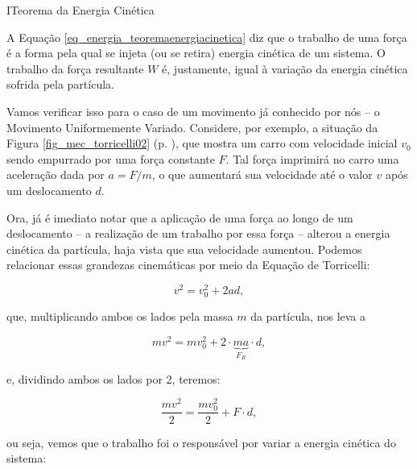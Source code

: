 \vspace{0.3cm}
















\begin{secnivel}{I}{Teorema da Energia Cinética}
 

  
\end{secnivel}








A Equação \eqref{eq_energia_teoremaenergiacinetica} diz que o trabalho de uma força é a forma pela qual se injeta (ou se retira) energia cinética de um sistema. O trabalho da força resultante $W$ é, justamente, igual à variação da energia cinética sofrida pela partícula.

Vamos verificar isso para o caso de um movimento já conhecido por nós -- o Movimento Uniformemente Variado. Considere, por exemplo, a situação da Figura \ref{fig_mec_torricelli02} (p. \pageref{fig_mec_torricelli02}), que mostra um carro com velocidade inicial $v_0$ sendo empurrado por uma força constante $F.$ Tal força imprimirá no carro uma aceleração dada por $a=F/m$, o que aumentará sua velocidade até o valor $v$ após um deslocamento $d$.

Ora, já é imediato notar que a aplicação de uma força ao longo de um deslocamento -- a realização de um trabalho por essa força -- alterou a energia cinética da partícula, haja vista que sua velocidade aumentou. Podemos relacionar essas grandezas cinemáticas por meio da Equação de Torricelli:

$$ v^2 = v_0^2 + 2ad,$$

\noindent que, multiplicando ambos os lados pela massa $m$ da partícula, nos leva a

$$ mv^2 = mv_0^2 + 2\cdot \underbrace{ma}_{F_R} \cdot d,$$

\noindent e, dividindo ambos os lados por 2, teremos:

$$ \dfrac{mv^2}{2} = \dfrac{mv_0^2}{2} + F\cdot d, $$

\noindent ou seja, vemos que o trabalho foi o responsável por variar a energia cinética do sistema:

